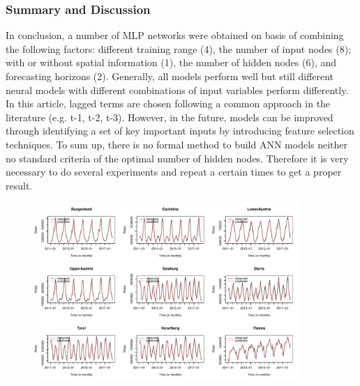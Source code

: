 \documentclass[a4paper,reqno,]{article}
\begin{document}
\subsubsection{Summary and Discussion}
In conclusion, a number of MLP networks were obtained on basis of combining the following factors: different training range (4), the number of input nodes (8); with or without spatial information (1), the number of hidden nodes (6), and forecasting horizons (2). Generally, all models perform well but still different neural models with different combinations of input variables perform differently. In this article, lagged terms are chosen following a common approach in the literature (e.g. t-1, t-2, t-3). However, in the future, models can be improved through identifying a set of key important inputs by introducing feature selection techniques.
To sum up, there is no formal method to build ANN models neither no standard criteria of the optimal number of hidden nodes. Therefore it is very necessary to do several experiments and repeat a certain times to get a proper result. 
\begin{figure}[H]
\begin{minipage}[b]{\textwidth}
\centering
  \includegraphics[width=0.9\textwidth]{images/ANN/oneahead_9final.pdf}
       \label{fig:1step_ann}
\end{minipage}
\end{figure}
\end{document}
